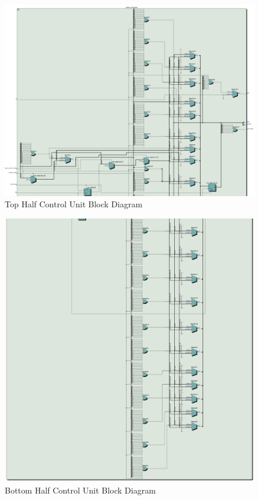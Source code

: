 \documentclass[journal, twocolumn, final,11pt,letterpaper]{IEEEtran}
\begin{document}
\begin{figure} [htbp]
	\centering
	\includegraphics[scale=0.55]{control-unit-top-half-diagram.png}
		\caption{Top Half Control Unit Block Diagram\label{fig:top-half-control}}
\end{figure}

\begin{figure} [htbp]
	\centering
	\includegraphics[scale=0.65]{control-unit-bottom-half-diagram.png}
	\caption{Bottom Half Control Unit Block Diagram\label{fig:bottom-half-control}}
\end{figure}
\end{document}
